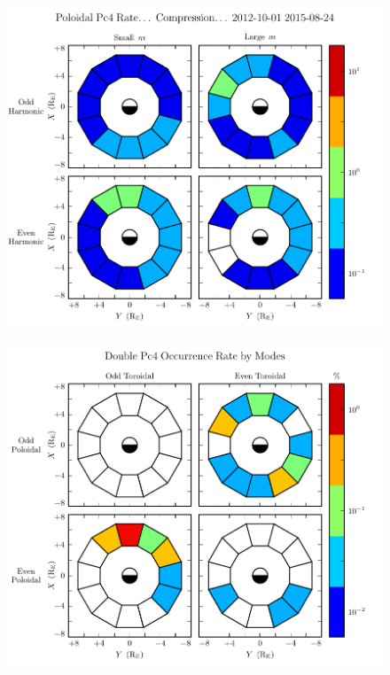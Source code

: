 \begin{figure}[!htb]
    \centering
    \includegraphics[width=\textwidth]{figures/azm_rate.pdf}
    \caption[Poloidal Pc4 Incidence by Modenumber]{
      \todo{$\cdots$}
    }
    \label{fig_azm_rate}
\end{figure}



\begin{figure}[!htb]
    \centering
    \includegraphics[width=\textwidth]{figures/double_rate.pdf}
    \caption[Double Pc4 Incidence by Modes]{
      \todo{$\cdots$}
    }
    \label{fig_double_rate}
\end{figure}
















